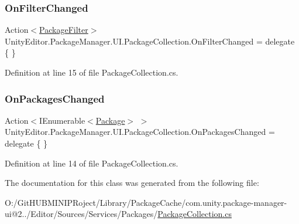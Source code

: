 \subsubsection{\texorpdfstring{OnFilterChanged}{OnFilterChanged}}
{\footnotesize\ttfamily Action$<$\mbox{\hyperlink{namespace_unity_editor_1_1_package_manager_1_1_u_i_aec89f744729646d8e261787be78942c8}{Package\+Filter}}$>$ Unity\+Editor.\+Package\+Manager.\+U\+I.\+Package\+Collection.\+On\+Filter\+Changed = delegate \{ \}}



Definition at line 15 of file Package\+Collection.\+cs.

\mbox{\label{class_unity_editor_1_1_package_manager_1_1_u_i_1_1_package_collection_a41622c71bb27ca9e063a73e09dffb382}} 
\subsubsection{\texorpdfstring{OnPackagesChanged}{OnPackagesChanged}}
{\footnotesize\ttfamily Action$<$I\+Enumerable$<$\mbox{\hyperlink{class_unity_editor_1_1_package_manager_1_1_u_i_1_1_package}{Package}}$>$ $>$ Unity\+Editor.\+Package\+Manager.\+U\+I.\+Package\+Collection.\+On\+Packages\+Changed = delegate \{ \}}



Definition at line 14 of file Package\+Collection.\+cs.



The documentation for this class was generated from the following file\+:\begin{DoxyCompactItemize}
\item 
O\+:/\+Git\+H\+U\+B\+M\+I\+N\+I\+P\+Roject/\+Library/\+Package\+Cache/com.\+unity.\+package-\/manager-\/ui@2../\+Editor/\+Sources/\+Services/\+Packages/\mbox{\hyperlink{_package_collection_8cs}{Package\+Collection.\+cs}}\end{DoxyCompactItemize}
